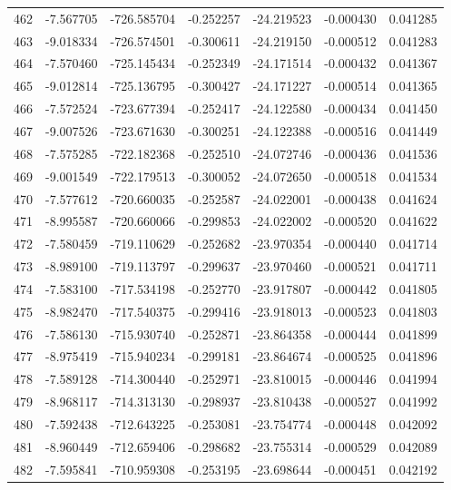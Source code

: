 \begin{tabular}{rrrrrrr}
 462 &  -7.567705 & -726.585704 & -0.252257 & -24.219523 &  -0.000430 &  0.041285 \\
 463 &  -9.018334 & -726.574501 & -0.300611 & -24.219150 &  -0.000512 &  0.041283 \\
 464 &  -7.570460 & -725.145434 & -0.252349 & -24.171514 &  -0.000432 &  0.041367 \\
 465 &  -9.012814 & -725.136795 & -0.300427 & -24.171227 &  -0.000514 &  0.041365 \\
 466 &  -7.572524 & -723.677394 & -0.252417 & -24.122580 &  -0.000434 &  0.041450 \\
 467 &  -9.007526 & -723.671630 & -0.300251 & -24.122388 &  -0.000516 &  0.041449 \\
 468 &  -7.575285 & -722.182368 & -0.252510 & -24.072746 &  -0.000436 &  0.041536 \\
 469 &  -9.001549 & -722.179513 & -0.300052 & -24.072650 &  -0.000518 &  0.041534 \\
 470 &  -7.577612 & -720.660035 & -0.252587 & -24.022001 &  -0.000438 &  0.041624 \\
 471 &  -8.995587 & -720.660066 & -0.299853 & -24.022002 &  -0.000520 &  0.041622 \\
 472 &  -7.580459 & -719.110629 & -0.252682 & -23.970354 &  -0.000440 &  0.041714 \\
 473 &  -8.989100 & -719.113797 & -0.299637 & -23.970460 &  -0.000521 &  0.041711 \\
 474 &  -7.583100 & -717.534198 & -0.252770 & -23.917807 &  -0.000442 &  0.041805 \\
 475 &  -8.982470 & -717.540375 & -0.299416 & -23.918013 &  -0.000523 &  0.041803 \\
 476 &  -7.586130 & -715.930740 & -0.252871 & -23.864358 &  -0.000444 &  0.041899 \\
 477 &  -8.975419 & -715.940234 & -0.299181 & -23.864674 &  -0.000525 &  0.041896 \\
 478 &  -7.589128 & -714.300440 & -0.252971 & -23.810015 &  -0.000446 &  0.041994 \\
 479 &  -8.968117 & -714.313130 & -0.298937 & -23.810438 &  -0.000527 &  0.041992 \\
 480 &  -7.592438 & -712.643225 & -0.253081 & -23.754774 &  -0.000448 &  0.042092 \\
 481 &  -8.960449 & -712.659406 & -0.298682 & -23.755314 &  -0.000529 &  0.042089 \\
 482 &  -7.595841 & -710.959308 & -0.253195 & -23.698644 &  -0.000451 &  0.042192 \\

\end{tabular}
